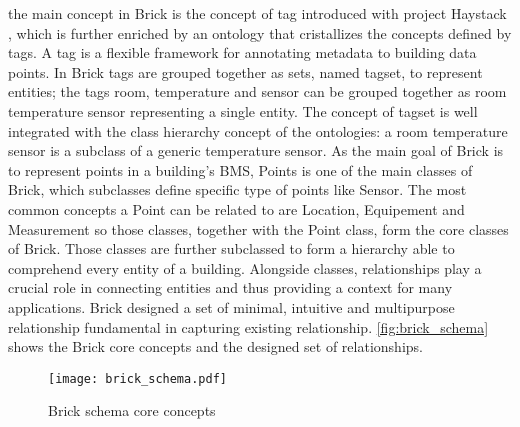 the main concept in Brick is the concept of tag introduced with project Haystack \cite{project_haystack}, which is further enriched by an ontology that cristallizes the concepts defined by tags. A tag is a flexible framework for annotating metadata to building data points. In Brick tags are grouped together as sets, named tagset, to represent entities; the tags {room}, {temperature} and {sensor} can be grouped together as {room temperature sensor} representing a single entity. The concept of tagset is well integrated with the class hierarchy concept of the ontologies: a {room temperature sensor} is a subclass of a generic {temperature sensor}.
As the main goal of Brick is to represent points in a building's BMS, Points is one of the main classes of Brick, which subclasses define specific type of points like Sensor. The most common concepts a Point can be related to are Location, Equipement and Measurement so those classes, together with the Point class, form the core classes of Brick. Those classes are further subclassed to form a hierarchy %
able to comprehend every entity of a building. Alongside classes, relationships play a crucial role in connecting entities and thus providing a context for many applications. Brick designed a set of minimal, intuitive and multipurpose relationship fundamental in capturing existing relationship. \autoref{fig:brick_schema} shows the Brick core concepts and the designed set of relationships.

\begin{figure}
  \centering
  \texttt{[image: brick\_schema.pdf]}
  \caption{Brick schema core concepts}
  \label{fig:brick_schema}
\end{figure}

